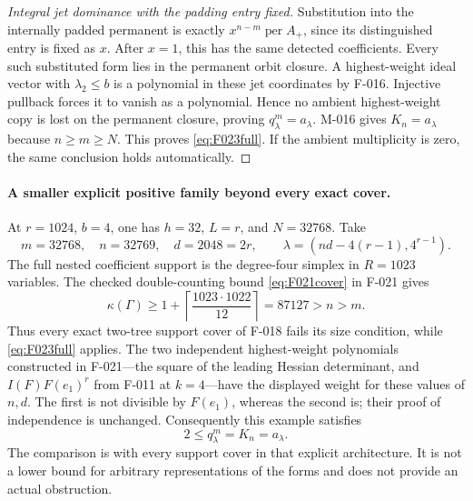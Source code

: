 \begin{proof}[Integral jet dominance with the padding entry fixed]
Substitution into the internally padded permanent is exactly
\(x^{n-m}\operatorname{per}A_+\), since its distinguished
entry is fixed as \(x\). After \(x=1\), this has the
same detected coefficients. Every such substituted form lies
in the permanent orbit closure. A highest-weight ideal vector
with \(\lambda_2\leq b\) is a polynomial in these jet
coordinates by F-016. Injective pullback forces it to vanish
as a polynomial. Hence no ambient highest-weight copy is lost
on the permanent closure, proving \(q^m_\lambda=a_\lambda\).
M-016 gives \(K_n=a_\lambda\) because \(n\geq m\geq N\).
This proves \eqref{eq:F023full}. If the ambient multiplicity
is zero, the same conclusion holds automatically.
\end{proof}

\paragraph{A smaller explicit positive family beyond every exact cover.}
At \(r=1024\), \(b=4\), one has \(h=32\), \(L=r\),
and \(N=32768\). Take
\[
 m=32768,\quad n=32769,\quad d=2048=2r,\qquad
                  \lambda=(nd-4(r-1),4^{r-1}).
                                                               \tag{F-023.7}
\]
The full nested coefficient support is the degree-four
simplex in \(R=1023\) variables. The checked double-counting
bound \eqref{eq:F021cover} in F-021 gives
\[
          \kappa(\Gamma)\geq1+\left\lceil
                         \frac{1023\cdot1022}{12}\right\rceil
                      =87127>n>m.
\]
Thus every exact two-tree support cover of F-018 fails its
size condition, while \eqref{eq:F023full} applies.
The two independent highest-weight polynomials constructed
in F-021---the square of the leading Hessian determinant,
and \(I(F)F(e_1)^r\) from F-011 at \(k=4\)---have
the displayed weight for these values of \(n,d\).
The first is not divisible by \(F(e_1)\), whereas the
second is; their proof of independence is unchanged.
Consequently this example satisfies
\[
                              2\leq q^m_\lambda=K_n=a_\lambda.
\]
The comparison is with every support cover in that explicit
architecture. It is not a lower bound for arbitrary
representations of the forms and does not provide an
actual obstruction.

